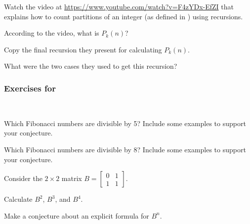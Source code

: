 \begin{exer}[\exerE] %
\label{exer_rec_count_partitions}
    Watch the video at \url{https://www.youtube.com/watch?v=F4zYDx-EfZI} that explains how to count partitions of an integer (as defined in ) using recursions.  
        \begin{exerpart}
            \item According to the video, what is $P_k(n)$? 
            \item Copy the final recursion they present for calculating $P_k(n)$.  
            \item What were the two cases they used to get this recursion? 
        \end{exerpart}
\end{exer}


\subsubsection*{Exercises for  \subfibpatterns}

\begin{exer}[\exerP] %
\label{exer_fib_mult5_mult8}
~
    \begin{apart}
        \item Which Fibonacci numbers are divisible by 5? Include some examples to support your conjecture.
        \item Which Fibonacci numbers are divisible by 8? Include some examples to support your conjecture.
    \end{apart}            
\end{exer}

\begin{exer}[\exerP] %
\label{exer_fib_matrix_another_conj}  
    Consider the $2 \times 2$ matrix $B= \left[\begin{array}{cc} 0 & 1\\ 1 & 1 \end{array} \right]$.
        \begin{exerpart}
            \item Calculate $B^2$, $B^3$, and $B^4$.
            \item Make a conjecture about an explicit formula for $B^n$.  
        \end{exerpart}
\end{exer}

